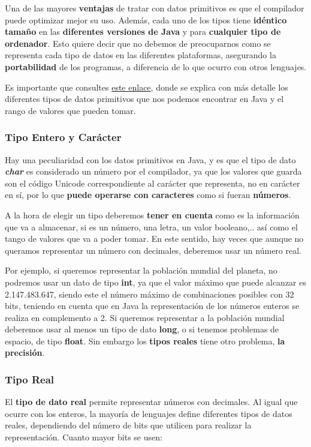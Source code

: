 Una de las mayores \textbf{ventajas} de tratar con datos primitivos es que el compilador puede optimizar mejor su uso. Además, cada uno de los tipos tiene \textbf{idéntico tamaño} en las \textbf{diferentes versiones de Java} y para \textbf{cualquier tipo de ordenador}. Esto quiere decir que no debemos de preocuparnos como se representa cada tipo de datos en las diferentes plataformas, asegurando la \textbf{portabilidad} de los programas, a diferencia de lo que ocurro con otros lenguajes.

Es importante que consultes \href{https://dcodingames.com/tipos-de-datos-en-java/}{este enlace}, donde se explica con más detalle los diferentes tipos de datos primitivos que nos podemos encontrar en Java y el rango de valores que pueden tomar.

\subsubsection{Tipo Entero y Carácter}

Hay una peculiaridad con los datos primitivos en Java, y es que el tipo de dato \textbf{\textit{char}} es considerado un número por el compilador, ya que los valores que guarda son el código Unicode correspondiente al carácter que representa, no en carácter en sí, por lo que \textbf{puede operarse con caracteres} como si fueran \textbf{números}.

A la hora de elegir un tipo deberemos \textbf{tener en cuenta} como es la información que va a almacenar, si es un número, una letra, un valor booleano,.. así como el tango de valores que va a poder tomar. En este sentido, hay veces que aunque no queramos representar un número con decimales, deberemos usar un número real.

Por ejemplo, si queremos representar la población mundial del planeta, no podremos usar un dato de tipo \textbf{int}, ya que el valor máximo que puede alcanzar es 2.147.483.647, siendo este el número máximo de combinaciones posibles con 32 bits, teniendo en cuenta que en Java la representación de los números enteros se realiza en complemento a 2. Si queremos representar a la población mundial deberemos usar al menos un tipo de dato \textbf{long}, o si tenemos problemas de espacio, de tipo \textbf{float}. Sin embargo los \textbf{tipos reales} tiene otro problema, \textbf{la precisión}.

\subsubsection{Tipo Real}
El \textbf{tipo de dato real} permite representar números con decimales. Al igual que ocurre con los enteros, la mayoría de lenguajes define diferentes tipos de datos reales, dependiendo del número de bits que utilicen para realizar la representación. Cuanto mayor bits se usen:

